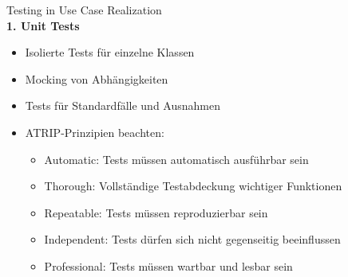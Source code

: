 \begin{KR}{Testing in Use Case Realization}\\
\textbf{1. Unit Tests}
\begin{itemize}
    \item Isolierte Tests für einzelne Klassen
    \item Mocking von Abhängigkeiten
    \item Tests für Standardfälle und Ausnahmen
    \item ATRIP-Prinzipien beachten:
    \begin{itemize}
        \item Automatic: Tests müssen automatisch ausführbar sein
        \item Thorough: Vollständige Testabdeckung wichtiger Funktionen
        \item Repeatable: Tests müssen reproduzierbar sein
        \item Independent: Tests dürfen sich nicht gegenseitig beeinflussen
        \item Professional: Tests müssen wartbar und lesbar sein
    \end{itemize}
\end{itemize}
\end{KR}

